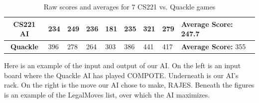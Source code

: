 \documentclass[12pt]{article}
\begin{document}
\begin{table}[h]
  \centering
\begin{tabular}{c|l|l|l|l|l|l|l|l}
  \textbf{CS221 AI} & 234 & 249 & 236 & 181 & 235 & 321 & 279 & \textbf{Average Score: } 247.7 \\\hline
  \textbf{Quackle}  & 396 & 278 & 264 & 303 & 386 & 441 & 417 & \textbf{Average Score: } 355\\
\end{tabular}
\caption{Raw scores and averages for 7 CS221 vs. Quackle games}
\end{table}

Here is an example of the input and output of our AI. On the left is an input board where the Quackle AI has played COMPOTE. Underneath is our AI's rack. On the right is the move our AI chose to make, RAJES. Beneath the figures is an example of the LegalMoves list, over which the AI maximizes. 
\end{document}

